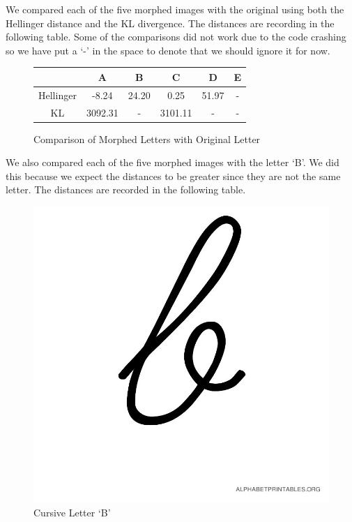 \documentclass{article}
\begin{document}
We compared each of the five morphed images with the original using both the
Hellinger distance and the KL divergence. The distances are recording in the
following table. Some of the comparisons did not work due to the code crashing
so we have put a `-' in the space to denote that we should ignore it for now.

\begin{figure}[h!]
\begin{center}
  \begin{tabular}{ c || c | c | c | c | c }
     & A & B & C & D & E \\ \hline
    Hellinger & -8.24 & 24.20 & 0.25 & 51.97 & - \\
    KL & 3092.31 & - & 3101.11 & - & -
  \end{tabular}
  \caption{Comparison of Morphed Letters with Original Letter}
\end{center}
\end{figure}

We also compared each of the five morphed images with the letter `B'. We did
this because we expect the distances to be greater since they are not the same
letter. The distances are recorded in the following table.

\begin{figure}[h!]
\begin{center}
\includegraphics[scale=0.16]{alphabet_cursive_letter_b.jpg}
\caption{Cursive Letter `B'}
\end{center}
\end{figure}
\end{document}
